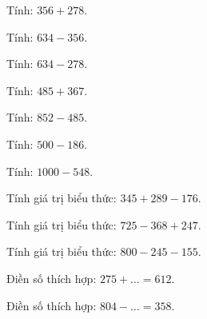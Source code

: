 \begin{ex}
Tính: $356 + 278$.
\end{ex}

\begin{ex}
Tính: $634 - 356$.
\end{ex}

\begin{ex}
Tính: $634 - 278$.
\end{ex}

\begin{ex}
Tính: $485 + 367$.
\end{ex}

\begin{ex}
Tính: $852 - 485$.
\end{ex}

\begin{ex}
Tính: $500 - 186$.
\end{ex}

\begin{ex}
Tính: $1000 - 548$.
\end{ex}

\begin{ex}
Tính giá trị biểu thức: $345 + 289 - 176$.
\end{ex}

\begin{ex}
Tính giá trị biểu thức: $725 - 368 + 247$.
\end{ex}

\begin{ex}
Tính giá trị biểu thức: $800 - 245 - 155$.
\end{ex}

\begin{ex}
Điền số thích hợp: $275 + \dots = 612$.
\end{ex}

\begin{ex}
Điền số thích hợp: $804 - \dots = 358$.
\end{ex}

